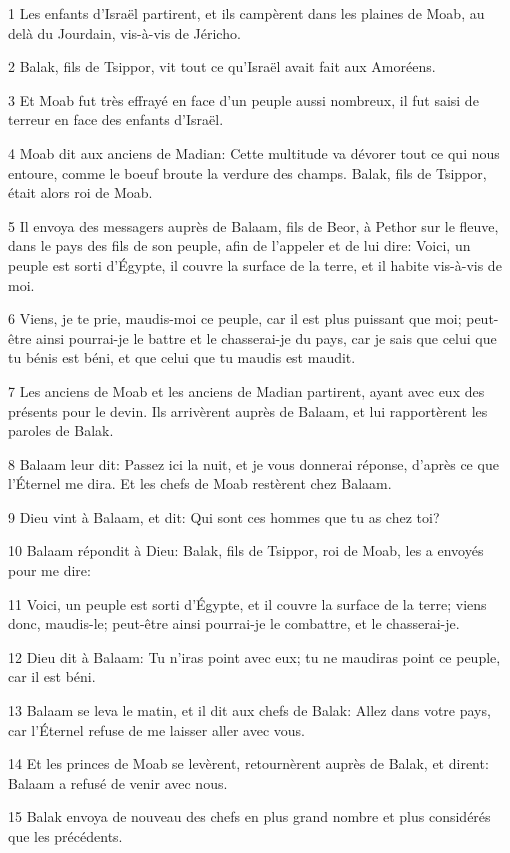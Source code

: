 \par 1 Les enfants d'Israël partirent, et ils campèrent dans les plaines de Moab, au delà du Jourdain, vis-à-vis de Jéricho.
\par 2 Balak, fils de Tsippor, vit tout ce qu'Israël avait fait aux Amoréens.
\par 3 Et Moab fut très effrayé en face d'un peuple aussi nombreux, il fut saisi de terreur en face des enfants d'Israël.
\par 4 Moab dit aux anciens de Madian: Cette multitude va dévorer tout ce qui nous entoure, comme le boeuf broute la verdure des champs. Balak, fils de Tsippor, était alors roi de Moab.
\par 5 Il envoya des messagers auprès de Balaam, fils de Beor, à Pethor sur le fleuve, dans le pays des fils de son peuple, afin de l'appeler et de lui dire: Voici, un peuple est sorti d'Égypte, il couvre la surface de la terre, et il habite vis-à-vis de moi.
\par 6 Viens, je te prie, maudis-moi ce peuple, car il est plus puissant que moi; peut-être ainsi pourrai-je le battre et le chasserai-je du pays, car je sais que celui que tu bénis est béni, et que celui que tu maudis est maudit.
\par 7 Les anciens de Moab et les anciens de Madian partirent, ayant avec eux des présents pour le devin. Ils arrivèrent auprès de Balaam, et lui rapportèrent les paroles de Balak.
\par 8 Balaam leur dit: Passez ici la nuit, et je vous donnerai réponse, d'après ce que l'Éternel me dira. Et les chefs de Moab restèrent chez Balaam.
\par 9 Dieu vint à Balaam, et dit: Qui sont ces hommes que tu as chez toi?
\par 10 Balaam répondit à Dieu: Balak, fils de Tsippor, roi de Moab, les a envoyés pour me dire:
\par 11 Voici, un peuple est sorti d'Égypte, et il couvre la surface de la terre; viens donc, maudis-le; peut-être ainsi pourrai-je le combattre, et le chasserai-je.
\par 12 Dieu dit à Balaam: Tu n'iras point avec eux; tu ne maudiras point ce peuple, car il est béni.
\par 13 Balaam se leva le matin, et il dit aux chefs de Balak: Allez dans votre pays, car l'Éternel refuse de me laisser aller avec vous.
\par 14 Et les princes de Moab se levèrent, retournèrent auprès de Balak, et dirent: Balaam a refusé de venir avec nous.
\par 15 Balak envoya de nouveau des chefs en plus grand nombre et plus considérés que les précédents.

